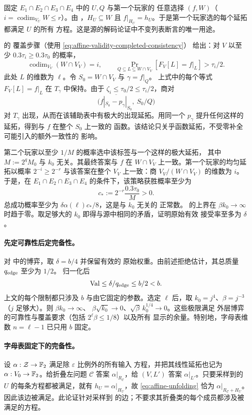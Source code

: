 固定 $E_1\cap E_2\cap E_3\cap E_4$ 中的 $U,Q$ 与第一个玩家的
任意选择 $(f,W)$（$i=\operatorname{codim}_{V_U}W\le r$）。由
，$H_U\subseteq W$ 且
$f|_{H_U}=h_U$。于是第一个玩家选的每个延拓都满足 $U$ 的所有
方程。这是源的解码论证中不变列表断言的唯一用途。

\cite[Lemmas~4.11 and~5.5 and the proof of Lemma~5.3]{DKKMS25} 的
覆盖步骤（使用 \eqref{eq:affine-validity-completed-consistency}）
给出：对 $V$ 以至少 $0.3\tau_i\ge0.3\tau_0$ 的概率，
\[
 \operatorname{codim}_{V_V}(W\cap V_V)=i,
 \qquad
 \Pr_{Q\subseteq L\subseteq W\cap V_V}
       [F_V[L]=f|_L]>\tau_i/2.
\]
此处 $L$ 的维数为 $\ell$。令 $S_0=W\cap V_V$ 与 $\gamma=f|_Q$。
上式中的每个等式 $F_V[L]=f|_L$ 在 $T_\gamma$ 中保持。由于
$\zeta_i\le\tau_0/2\le\tau_i/2$，商对
\[
 \bigl(\overline{f|_{S_0}-p_\gamma|_{S_0}},\ S_0/Q\bigr)
\]
对 $T_\gamma$ 出现，从而在该辅助表中有极大的出现延拓。用同一个
$p_\gamma$ 提升任何这样的延拓，得到与 $f$ 在整个 $S_0$ 上一致的
函数。该结论只关乎函数延拓，不受零补全可能引入的额外一致性的
影响。

第二个玩家以至少 $1/M$ 的概率选中该标签与一个这样的极大延拓，
其中 $M:=2^qM_0$ 与 $k_0$ 无关。其最终答案与 $f$ 在
$W\cap V_V$ 上一致。第一个玩家的均匀延拓以概率
$2^{-i}\ge2^{-r}$ 与该答案在整个 $V_V$ 上一致：商
$V_V/(W\cap V_V)$ 的维数为 $i$。于是，在 $E_1\cap E_2\cap E_3\cap E_4$
的条件下，该策略获胜概率至少为
\[
 c_*:=2^{-r}\frac{0.3\tau_0}{M}>0.
\]
总成功概率至少为 $\delta\alpha(\ell)c_*/8$，这是与 $k_0$ 无关的
正常数。\cite[Lemma~5.4]{DKKMS25} 的上界在 $\beta k_0\to\infty$
时趋于零。取足够大的 $k_0$ 即得与源中相同的矛盾，证明原始有效
接受率至多为 $\delta$。

\paragraph{先定可靠性后定完备性。}
对  中的博弈，取 $\delta=b/4$ 并保留有效的
原始权重。由前述拒绝估计，其总质量 $q_{\rm edge}$ 至少为 $1/2$。
归一化后
\[
  \operatorname{Val}\le\delta/q_{\rm edge}\le b/2<b.
\]
上文的每个限制都只涉及 $b$ 与由它固定的参数。选定 $\ell$ 后，取
$k_0=j^4$、$\beta=j^{-3}$（$j$ 足够大）。则 $\beta k_0\to\infty$、
$\beta\sqrt{k_0}\to0$、$\sqrt\beta\,k_0^{1/4}\to0$。这些极限满足
外层博弈的可靠性与覆盖要求（包括 $2^\ell\beta\le1/8$）以及所有
显示的余量。特别地，字母表维数 $n=\ell-1$ 已只用 $b$ 固定。

\paragraph{字母表固定下的完备性。}
设 $\alpha:\mathcal Z\to\mathbb F_2$ 满足除 $\varepsilon$ 比例外的所有输入
方程，并把其线性延拓也记为 $\alpha:V_0\to\mathbb F_2$。给折叠左问题
$\mathcal C$ 答案 $\alpha|_{R_{\mathcal C}}$，给 $(V,L')$ 答案
$\alpha|_{L'}$。只要采样到的 $U$ 的每条方程都被满足，就有
$h_U=\alpha|_{H_U}$，故 \eqref{eq:affine-unfolding} 恰为
$\alpha|_{R_{\mathcal C}+H_U}$。因此该边被满足。此论证针对采样到
的边；不要求其折叠类的每个成员都涉及被满足的方程。

